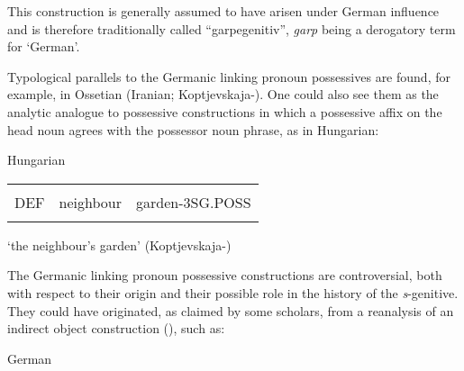 \begin{styleBodyTextFirst}
This construction is generally assumed to have arisen under German influence and is therefore traditionally called “garpegenitiv”, \textit{garp} being a derogatory term for ‘German’.

\end{styleBodyTextFirst}

\begin{styleBodytextC}
Typological parallels to the Germanic linking pronoun possessives are found, for example, in Ossetian (Iranian; Koptjevskaja-\citet[669]{Tamm2003}). One could also see them as the analytic analogue to possessive constructions in which a possessive affix on the head noun agrees with the possessor noun phrase, as in Hungarian:

\end{styleBodytextC}

\begin{listWWNumileveli}
\item {}

\begin{styleExample}
Hungarian

\end{styleExample}

\end{listWWNumileveli}

\begin{tabular}{lll}
\lsptoprule
\multicolumn{3}{l}{a

}\\
DEF & neighbour & garden-3SG.POSS\\
\lspbottomrule
\end{tabular}

\begin{styleTranslation}
‘the neighbour’s garden’ (Koptjevskaja-\citet[648]{Tamm2003}) 

\end{styleTranslation}

\begin{styleBodyTextFirst}
The Germanic linking pronoun possessive constructions are controversial, both with respect to their origin and their possible role in the history of the \textit{s}{}-genitive. They could have originated, as claimed by some scholars, from a reanalysis of an indirect object construction (\citet[638]{Behaghel1923}), such as:

\end{styleBodyTextFirst}

\begin{listWWNumileveli}
\item {}

\begin{styleExample}
German

\end{styleExample}

\end{listWWNumileveli}

